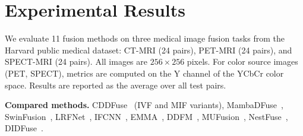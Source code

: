 \documentclass[a4paper,12pt]{article}
\begin{document}
\section{Experimental Results}

We evaluate 11 fusion methods on three medical image fusion tasks from the
Harvard public medical dataset: CT-MRI (24 pairs), PET-MRI (24 pairs), and
SPECT-MRI (24 pairs). All images are $256 \times 256$ pixels. For color
source images (PET, SPECT), metrics are computed on the Y channel of the
YCbCr color space. Results are reported as the average over all test pairs.

\medskip
\noindent\textbf{Compared methods.}
CDDFuse~\cite{cddfuse} (IVF and MIF variants),
MambaDFuse~\cite{mambadfuse},
SwinFusion~\cite{swinfusion},
LRFNet~\cite{lrfnet},
IFCNN~\cite{ifcnn},
EMMA~\cite{emma},
DDFM~\cite{ddfm},
MUFusion~\cite{mufusion},
NestFuse~\cite{nestfuse},
DIDFuse~\cite{didfuse}.

\clearpage
{}
\end{document}
